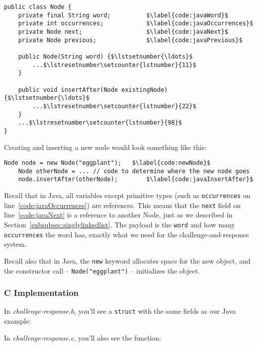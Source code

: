 \begin{lstlisting}[mathescape=true]
public class Node {
    private final String word;          $\label{code:javaWord}$
    private int occurrences;            $\label{code:javaOccurrences}$
    private Node next;                  $\label{code:javaNext}$
    private Node previous;              $\label{code:javaPrevious}$

    public Node(String word) {$\lstsetnumber{\ldots}$
        ...$\lstresetnumber\setcounter{lstnumber}{11}$
    }

    public void insertAfter(Node existingNode) {$\lstsetnumber{\ldots}$
        ...$\lstresetnumber\setcounter{lstnumber}{22}$
    }
    ...$\lstresetnumber\setcounter{lstnumber}{98}$
}
\end{lstlisting}

Creating and inserting a new node would look something like this:

\begin{lstlisting}[firstnumber=200, mathescape=true]
    Node node = new Node("eggplant");   $\label{code:newNode}$
    Node otherNode = ... // code to determine where the new node goes
    node.insertAfter(otherNode);        $\label{code:javaInsertAfter}$
\end{lstlisting}

Recall that in Java, all variables except primitive types (such as \lstinline{occurrences} on line~\ref{code:javaOccurrences}) are references.
This means that the \lstinline{next} field on line~\ref{code:javaNext} is a reference to another Node, just as we described in Section~\ref{subsubsec:singlylinkedlist}.
The payload is the \lstinline{word} and how many \lstinline{occurrences} the word has, exactly what we need for the challenge-and-response system.

Recall also that in Java, the \lstinline{new} keyword allocates space for the new object, and the constructor call -- \lstinline{Node("eggplant")} -- initializes the object.

\subsubsection{C Implementation}

In \textit{challenge-response.h}, you'll see a \lstinline{struct} with the same fields as our Java example:



In \textit{challenge-response.c}, you'll also see the  function:

